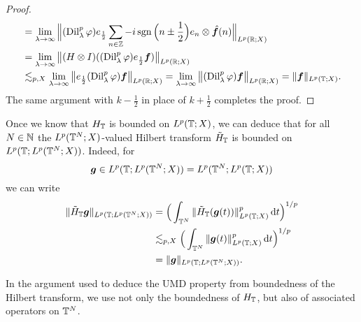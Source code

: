 \begin{proof}
\begin{equation*}
\begin{aligned}
         &= \lim_{\lambda \to \infty} \Big\| (\operatorname{Dil}_{\lambda}^{p}\varphi) e_{\frac{1}{2}} \sum_{n \in \mathbb{Z}} -i \operatorname{sgn}\Big(n\pm\frac{1}{2}\Big) e_{n} \otimes \hat{\bm{f}}(n) \Big\|_{L^p(\mathbb{R};X)} \\
         &= \lim_{\lambda \to \infty} \big\| (H \otimes I)((\operatorname{Dil}_{\lambda}^{p} \varphi)e_{\frac{1}{2}} \bm{f}) \big\|_{L^p(\mathbb{R};X)} \\
         &\lesssim_{p,X} \lim_{\lambda \to \infty} \big\| e_{\frac{1}{2}} (\operatorname{Dil}_{\lambda}^{p} \varphi)  \bm{f} \big\|_{L^p(\mathbb{R};X)} 
         = \lim_{\lambda \to \infty} \big\| (\operatorname{Dil}_{\lambda}^{p} \varphi)  \bm{f} \big\|_{L^p(\mathbb{R};X)} 
         = \| \bm{f} \|_{L^p(\mathbb{T};X)}.
       \end{aligned}
     \end{equation*}
     The same argument with $k - \frac{1}{2}$ in place of $k + \frac{1}{2}$ completes the proof.
   \end{proof}

   \begin{rmk}\label{rmk:HT-fubini}
     Once we know that $H_{\mathbb{T}}$ is bounded on $L^p(\mathbb{T};X)$, we can deduce that for all $N \in \mathbb{N}$ the $L^p(\mathbb{T}^{N};X)$-valued Hilbert transform $\tilde{H}_{\mathbb{T}}$ is bounded on $L^p(\mathbb{T};L^p(\mathbb{T}^{N};X))$.
     Indeed, for
     \begin{equation*}
       \bm{g} \in L^p(\mathbb{T}; L^p(\mathbb{T}^{N};X)) = L^p(\mathbb{T}^{N};L^p(\mathbb{T};X))
     \end{equation*}
     we can write
     \begin{equation*}
       \begin{aligned}
         \|\tilde{H}_{\mathbb{T}} \bm{g}\|_{L^p(\mathbb{T};L^p(\mathbb{T}^{N};X))}
         &= \Big( \int_{\mathbb{T}^{N}} \|\tilde{H}_{\mathbb{T}} (\bm{g}(t))\|_{L^p(\mathbb{T};X)}^{p} \, \mathrm{d} t \Big)^{1/p} \\
         &\lesssim_{p,X} \Big( \int_{\mathbb{T}^{N}} \| \bm{g}(t)\|_{L^p(\mathbb{T};X)}^{p} \, \mathrm{d} t \Big)^{1/p} \\
         &= \|\bm{g}\|_{L^p(\mathbb{T};L^p(\mathbb{T}^{N};X))}.
       \end{aligned}
     \end{equation*}
   \end{rmk}
   
  In the argument used to deduce the UMD property from boundedness of the Hilbert transform, we use not only the boundedness of $H_{\mathbb{T}}$, but also of associated operators on $\mathbb{T}^{N}$.

